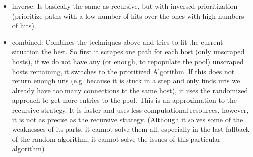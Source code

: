 \documentclass[USenglish,oneside,twocolumn]{article}
\begin{document}
\begin{itemize}
\begin{itemize}
\begin{itemize}
        \item inverse: Is basically the same as recursive, but with inversed prioritization (prioritize paths with a low number of hits over the ones with high numbers of hits).
        \item combined: Combines the techniques above and tries to fit the current situation the best. So first it scrapes one path for each host (only unscraped hosts), if we do not have any (or enough, to repopulate the pool) unscraped hosts remaining, it switches to the prioritized Algorithm. If this does not return enough uris (e.g. because it is stuck in a step and only finds uris we already have too many connections to the same host), it uses the randomized approach to get more entries to the pool. 
        This is an approximation to the recursive strategy. It is faster and uses less computational resources, however, it is not as precise as the recursive strategy. (Although it solves some of the weaknesses of its parts, it cannot solve them all, especially in the last fallback of the random algorithm, it cannot solve the issues of this particular algorithm)
      \end{itemize}


\end{itemize}
\end{itemize}
\end{document}
